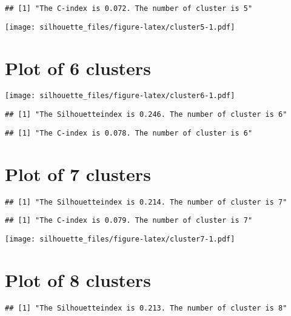 \documentclass[
]{article}
\begin{document}
\begin{verbatim}
## [1] "The C-index is 0.072. The number of cluster is 5"
\end{verbatim}

\texttt{[image: silhouette\_files/figure-latex/cluster5-1.pdf]}

\newpage

\hypertarget{plot-of-6-clusters}{%
\section{Plot of 6 clusters}\label{plot-of-6-clusters}}

\texttt{[image: silhouette\_files/figure-latex/cluster6-1.pdf]}

\begin{verbatim}
## [1] "The Silhouetteindex is 0.246. The number of cluster is 6"
\end{verbatim}

\begin{verbatim}
## [1] "The C-index is 0.078. The number of cluster is 6"
\end{verbatim}

\newpage

\hypertarget{plot-of-7-clusters}{%
\section{Plot of 7 clusters}\label{plot-of-7-clusters}}

\begin{verbatim}
## [1] "The Silhouetteindex is 0.214. The number of cluster is 7"
\end{verbatim}

\begin{verbatim}
## [1] "The C-index is 0.079. The number of cluster is 7"
\end{verbatim}

\texttt{[image: silhouette\_files/figure-latex/cluster7-1.pdf]}

\newpage

\hypertarget{plot-of-8-clusters}{%
\section{Plot of 8 clusters}\label{plot-of-8-clusters}}

\begin{verbatim}
## [1] "The Silhouetteindex is 0.213. The number of cluster is 8"
\end{verbatim}
\end{document}

